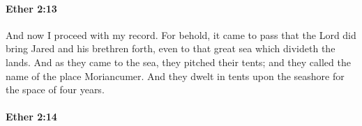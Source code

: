 		\paragraph{Ether 2:13} %
			\label{ETHER-2-13}

			And now I proceed with my record.
			For behold, it came to pass that the Lord did bring Jared and his brethren forth,
			even to that great sea which divideth the lands.
			And as they came to the sea, they pitched their tents;
			and they called the name of the place Moriancumer.
			And they dwelt in tents upon the seashore for the space of four years.

		\paragraph{Ether 2:14} %
			\label{ETHER-2-14}

